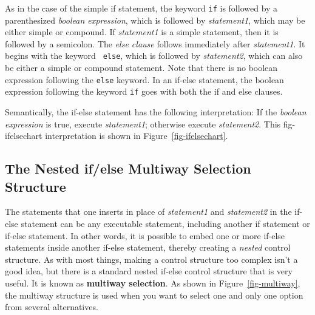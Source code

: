 \noindent As in the case of the simple if statement, the
keyword {\tt if} is followed by a parenthesized {\it boolean
expression}, which is followed by {\it statement1}, which may be
either simple or compound.  If {\it statement1} is a simple statement,
then it is followed by a semicolon.  The {\it else clause} follows
immediately after {\it statement1}. It begins with the keyword {\tt
else}, which is followed by {\it statement2}, which can also be either
a simple or compound statement. Note that there is no boolean
expression following the {\tt else} keyword. In an if-else statement,
the boolean expression following the keyword {\tt if} goes with both
the if and else clauses.

Semantically, the if-else statement has the
following interpretation: If the {\it boolean expression} is true,
execute {\it statement1}; otherwise execute {\it statement2}.  This
{fig-ifelsechart}
interpretation is shown in Figure~\ref{fig-ifelsechart}.

\subsection{The Nested if/else Multiway Selection Structure}
\label{sec-multi}

\noindent The statements that one inserts in place of {\it statement1} and {\it
statement2} in the if-else statement can be any executable statement,
including another if statement or if-else statement.  In other words,
it is possible to embed one or more if-else statements inside another
if-else statement, thereby creating a {\it nested} control structure.  As with most things, making a control
structure too complex isn't a good idea, but there is a standard
nested if-else control structure that is very useful.  It is known as
{\bf multiway selection}. As shown in
Figure~\ref{fig-multiway}, the multiway structure is used when you
want to select one and only one option from several alternatives.

